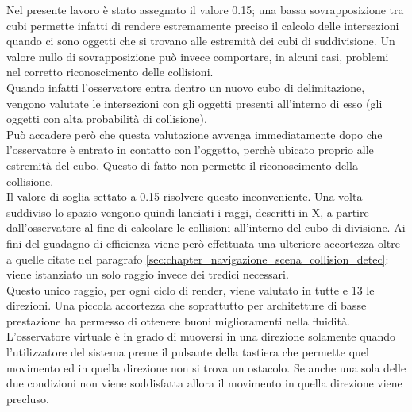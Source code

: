 Nel presente lavoro è stato assegnato il valore 0.15; una bassa sovrapposizione tra cubi permette infatti di rendere estremamente preciso il calcolo delle intersezioni quando ci sono oggetti che si trovano alle estremità dei cubi di suddivisione. Un valore nullo di sovrapposizione può invece comportare, in alcuni casi, problemi nel corretto riconoscimento delle collisioni.
\\
Quando infatti l’osservatore entra dentro un nuovo cubo di delimitazione, vengono valutate le intersezioni con gli oggetti presenti all’interno di esso (gli oggetti con alta probabilità di collisione).
\\
Può accadere però che questa valutazione avvenga immediatamente dopo che l’osservatore è entrato in contatto con l’oggetto, perchè ubicato proprio alle estremità del cubo. Questo di fatto non permette il riconoscimento della collisione.
\\ 
Il valore di soglia settato a 0.15 risolvere questo inconveniente.
Una volta suddiviso lo spazio vengono quindi lanciati i raggi, descritti in X, a partire dall’osservatore  al fine di calcolare le collisioni all’interno del cubo di divisione.
Ai fini del guadagno di efficienza viene però effettuata una ulteriore accortezza oltre a quelle citate nel paragrafo \ref{sec:chapter_navigazione_scena_collision_detec}: viene istanziato un solo raggio invece dei tredici necessari.
\\ 
Questo unico raggio, per ogni ciclo di render, viene valutato in tutte e 13 le direzioni. 
Una piccola accortezza che soprattutto per architetture di basse prestazione ha permesso di ottenere buoni miglioramenti nella fluidità.
\\
L’osservatore virtuale è in grado di muoversi in una direzione solamente quando l’utilizzatore del sistema preme il pulsante della tastiera che permette quel movimento ed in quella direzione non si trova un ostacolo. Se anche una sola delle due condizioni non viene soddisfatta allora il movimento in quella direzione viene precluso.
\\

